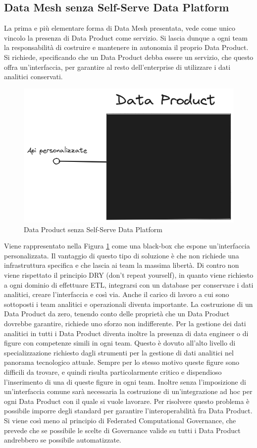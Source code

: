 \documentclass[a4paper,12pt]{report}
\begin{document}
\subsection{Data Mesh senza Self-Serve Data Platform}
La prima e più elementare forma di Data Mesh presentata, vede come unico vincolo la presenza di Data Product come servizio.
Si lascia dunque a ogni team la responsabilità di costruire e mantenere in autonomia il proprio Data Product.
Si richiede, specificando che un Data Product debba essere un servizio, che questo offra un'interfaccia, per garantire al resto dell'enterprise di utilizzare i dati analitici conservati.
\begin{figure}
    \centering
    \includegraphics[width=0.5\linewidth]{immagini/data mesh elementare.png}
    \caption{Data Product senza Self-Serve Data Platform}
    \label{fig:dp senza SSDP}
\end{figure}

Viene rappresentato nella Figura \ref{fig:dp senza SSDP} come una black-box che espone un'interfaccia personalizzata.
Il vantaggio di questo tipo di soluzione è che non richiede una infrastruttura specifica e che lascia ai team la massima libertà.
Di contro non viene rispettato il principio DRY (don't repeat yourself), in quanto viene richiesto a ogni dominio di effettuare ETL, integrarsi con un database per conservare i dati analitici, creare l'interfaccia e così via.
Anche il carico di lavoro a cui sono sottoposti i team analitici e operazionali diventa importante.
La costruzione di un Data Product da zero, tenendo conto delle proprietà che un Data Product dovrebbe garantire, richiede uno sforzo non indifferente.
Per la gestione dei dati analitici in tutti i Data Product diventa inoltre la presenza di data engineer o di figure con competenze simili in ogni team.
Questo è dovuto all'alto livello di specializzazione richiesto dagli strumenti per la gestione di dati analitici nel panorama tecnologico attuale.
Sempre per lo stesso motivo queste figure sono difficili da trovare, e quindi risulta particolarmente critico e dispendioso l'inserimento di una di queste figure in ogni team.
Inoltre senza l'imposizione di un'interfaccia comune sarà necessaria la costruzione di un'integrazione ad hoc per ogni Data Product con il quale si vuole lavorare. 
Per risolvere questo problema è possibile imporre degli standard per garantire l'interoperabilità fra Data Product.
Si viene così meno al principio di Federated Computational Governance, che prevede che se possibile le scelte di Governance valide su tutti i Data Product andrebbero se possibile automatizzate. 
\end{document}
